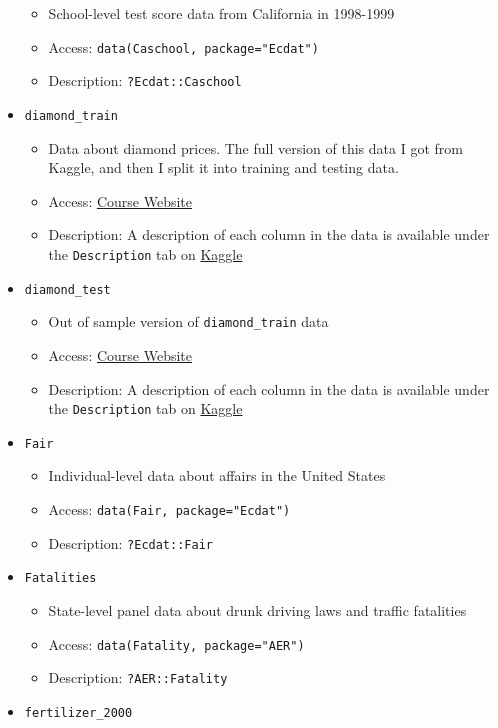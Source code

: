 \documentclass[
  letterpaper,
  DIV=11,
  numbers=noendperiod]{scrreprt}
\begin{document}
\begin{itemize}
  \begin{itemize}
  \item
    School-level test score data from California in 1998-1999
  \item
    Access: \texttt{data(Caschool,\ package="Ecdat")}
  \item
    Description: \texttt{?Ecdat::Caschool}
  \end{itemize}
\item
  \texttt{diamond\_train}

  \begin{itemize}
  \item
    Data about diamond prices. The full version of this data I got from
    Kaggle, and then I split it into training and testing data.
  \item
    Access:
    \href{http://bcallaway11.github.io/Courses/ECON_4750_Fall_2023/}{Course
    Website}
  \item
    Description: A description of each column in the data is available
    under the \texttt{Description} tab on
    \href{https://www.kaggle.com/shivam2503/diamonds/}{Kaggle}
  \end{itemize}
\item
  \texttt{diamond\_test}

  \begin{itemize}
  \item
    Out of sample version of \texttt{diamond\_train} data
  \item
    Access:
    \href{http://bcallaway11.github.io/Courses/ECON_4750_Fall_2023/}{Course
    Website}
  \item
    Description: A description of each column in the data is available
    under the \texttt{Description} tab on
    \href{https://www.kaggle.com/shivam2503/diamonds/}{Kaggle}
  \end{itemize}
\item
  \texttt{Fair}

  \begin{itemize}
  \item
    Individual-level data about affairs in the United States
  \item
    Access: \texttt{data(Fair,\ package="Ecdat")}
  \item
    Description: \texttt{?Ecdat::Fair}
  \end{itemize}
\item
  \texttt{Fatalities}

  \begin{itemize}
  \item
    State-level panel data about drunk driving laws and traffic
    fatalities
  \item
    Access: \texttt{data(Fatality,\ package="AER")}
  \item
    Description: \texttt{?AER::Fatality}
  \end{itemize}
\item
  \texttt{fertilizer\_2000}


\end{itemize}
\end{document}
